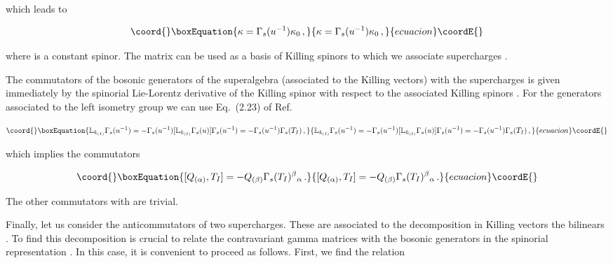 \documentclass[12pt,a4paper]{article}
\begin{document}
\noindent
which leads to

\begin{equation}\coord{}\boxEquation{
\kappa = \Gamma_{s}(u^{-1})\kappa_{0}\, ,
}{
\kappa = \Gamma_{s}(u^{-1})\kappa_{0}\, ,
}{ecuacion}\coordE{}\end{equation}

\noindent
where \coordHE{} is a constant spinor. The matrix
\coordHE{} can be used as a basis of
Killing spinors \myHighlight{$\kappa_{(\alpha)}{}^{\beta}$}\coordHE{} to which we associate
supercharges \coordHE{}.

The commutators of the bosonic generators \coordHE{} of the
superalgebra (associated to the Killing vectors) with the supercharges
is given immediately by the spinorial Lie-Lorentz derivative of the
Killing spinor with respect to the associated Killing spinors
\cite{Figueroa-O'Farrill:1999va,Ortin:2002qb}. For the generators
associated to the left isometry group \coordHE{} we can
use Eq.~(2.23) of Ref.~\cite{Alonso-Alberca:2002gh}

\begin{equation}\coord{}\boxEquation{
\mathbb{L}_{k_{(I)}} \Gamma_{s}(u^{-1}) =
-\Gamma_{s}(u^{-1}) 
[\mathbb{L}_{k_{(I)}} \Gamma_{s}(u)] \Gamma_{s}(u^{-1}) = 
-\Gamma_{s}(u^{-1}) \Gamma_{s}(T_{I})\, ,
}{
\mathbb{L}_{k_{(I)}} \Gamma_{s}(u^{-1}) =
-\Gamma_{s}(u^{-1}) 
[\mathbb{L}_{k_{(I)}} \Gamma_{s}(u)] \Gamma_{s}(u^{-1}) = 
-\Gamma_{s}(u^{-1}) \Gamma_{s}(T_{I})\, ,
}{ecuacion}\coordE{}\end{equation}

\noindent 
which implies the commutators

\begin{equation}\coord{}\boxEquation{
\label{eq:QTcommutators}
[Q_{(\alpha)},T_{I}] = -Q_{(\beta)}  \Gamma_{s}(T_{I})^{\beta}{}_{\alpha}\, .
}{
[Q_{(\alpha)},T_{I}] = -Q_{(\beta)}  \Gamma_{s}(T_{I})^{\beta}{}_{\alpha}\, .
}{ecuacion}\coordE{}\end{equation}

The other commutators with \coordHE{} are trivial.

Finally, let us consider the anticommutators of two supercharges.
These are associated to the decomposition in Killing vectors the
bilinears \coordHE{}.
To find this decomposition is crucial to relate the contravariant
gamma matrices \coordHE{} with the bosonic generators in the
spinorial representation \coordHE{}. In this case, it is
convenient to proceed as follows. First, we find the relation
\end{document}
